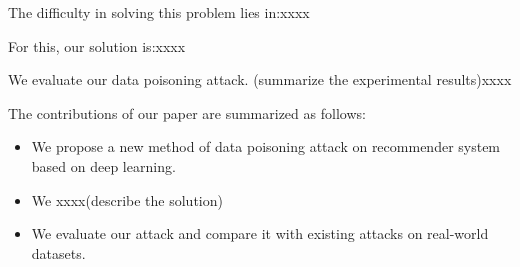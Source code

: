 	The difficulty in solving this problem lies in:xxxx
	
	For this, our solution is:xxxx
	
	We evaluate our data poisoning attack. (summarize the experimental results)xxxx
	
	The contributions of our paper are summarized as follows: 
	\begin{itemize}
		\item We propose a new method of data poisoning attack on recommender system based on deep learning.
		\item We xxxx(describe the solution)
		\item We evaluate our attack and compare it with existing attacks on real-world datasets.
	\end{itemize}
	
	
	
	
	
